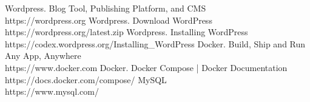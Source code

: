 \documentclass{school}
\begin{document}
\newpage
\begin{thebibliography}{9}
 Wordpress. Blog Tool, Publishing Platform, and CMS \\ https://wordpress.org
 Wordpress. Download WordPress \\ https://wordpress.org/latest.zip
 Wordpress. Installing WordPress \\ https://codex.wordpress.org/Installing\_WordPress
 Docker. Build, Ship and Run Any App, Anywhere \\ https://www.docker.com
 Docker. Docker Compose | Docker Documentation \\ https://docs.docker.com/compose/
 MySQL \\ https://www.mysql.com/
\end{thebibliography}

\end{document}
